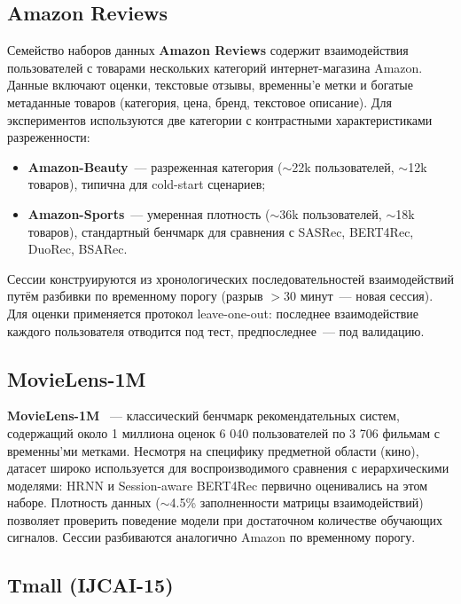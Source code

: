 \subsection{Amazon Reviews}
\label{subsec:ch1:amazon}

Семейство наборов данных \textbf{Amazon Reviews} \cite{mcauley2015amazon} содержит взаимодействия пользователей с товарами нескольких категорий интернет-магазина Amazon. Данные включают оценки, текстовые отзывы, временны'е метки и богатые метаданные товаров (категория, цена, бренд, текстовое описание). Для экспериментов используются две категории с контрастными характеристиками разреженности:

\begin{itemize}
    \item \textbf{Amazon-Beauty}~--- разреженная категория ($\sim$22k пользователей, $\sim$12k товаров), типична для cold-start сценариев;
    \item \textbf{Amazon-Sports}~--- умеренная плотность ($\sim$36k пользователей, $\sim$18k товаров), стандартный бенчмарк для сравнения с SASRec, BERT4Rec, DuoRec, BSARec.
\end{itemize}

Сессии конструируются из хронологических последовательностей взаимодействий путём разбивки по временному порогу (разрыв $>30$ минут~--- новая сессия). Для оценки применяется протокол leave-one-out: последнее взаимодействие каждого пользователя отводится под тест, предпоследнее~--- под валидацию.

\subsection{MovieLens-1M}
\label{subsec:ch1:movielens}

\textbf{MovieLens-1M} \cite{harper2015movielens}~--- классический бенчмарк рекомендательных систем, содержащий около 1 миллиона оценок 6 040 пользователей по 3 706 фильмам с временны'ми метками. Несмотря на специфику предметной области (кино), датасет широко используется для воспроизводимого сравнения с иерархическими моделями: HRNN \cite{quadrana2017hrnn} и Session-aware BERT4Rec \cite{seol2022session} первично оценивались на этом наборе. Плотность данных ($\sim$4.5\% заполненности матрицы взаимодействий) позволяет проверить поведение модели при достаточном количестве обучающих сигналов. Сессии разбиваются аналогично Amazon по временному порогу.

\subsection{Tmall (IJCAI-15)}
\label{subsec:ch1:tmall}

